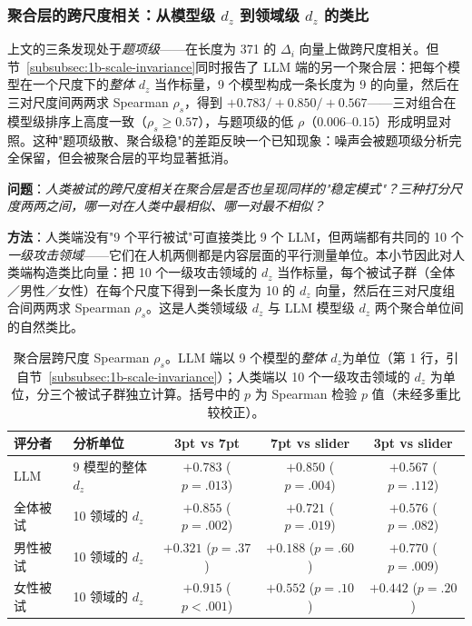 \documentclass[UTF8,12pt]{ctexart}
\begin{document}
\subsubsection{聚合层的跨尺度相关：从模型级 $d_z$ 到领域级 $d_z$ 的类比}
\label{subsubsec:2a-cross-scale-aggregate}

上文的三条发现处于\emph{题项级}——在长度为 371 的 $\Delta_i$ 向量上做跨尺度相关。但节~\ref{subsubsec:1b-scale-invariance}同时报告了 LLM 端的另一个聚合层：把每个模型在一个尺度下的\emph{整体} $d_z$ 当作标量，9 个模型构成一条长度为 9 的向量，然后在三对尺度间两两求 Spearman $\rho_s$，得到 $+0.783 / +0.850 / +0.567$——三对组合在模型级排序上高度一致（$\rho_s \geq 0.57$），与题项级的低 $\rho$（$0.006$--$0.15$）形成明显对照。这种"题项级散、聚合级稳"的差距反映一个已知现象：噪声会被题项级分析完全保留，但会被聚合层的平均显著抵消。

\textbf{问题}：\emph{人类被试的跨尺度相关在聚合层是否也呈现同样的"稳定模式"？三种打分尺度两两之间，哪一对在人类中最相似、哪一对最不相似？}

\textbf{方法}：人类端没有"9 个平行被试"可直接类比 9 个 LLM，但两端都有共同的 10 个\emph{一级攻击领域}——它们在人机两侧都是内容层面的平行测量单位。本小节因此对人类端构造类比向量：把 10 个一级攻击领域的 $d_z$ 当作标量，每个被试子群（全体／男性／女性）在每个尺度下得到一条长度为 10 的 $d_z$ 向量，然后在三对尺度组合间两两求 Spearman $\rho_s$。这是人类领域级 $d_z$ 与 LLM 模型级 $d_z$ 两个聚合单位间的自然类比。

\begin{table}[htbp]
    \centering
    \caption{聚合层跨尺度 Spearman $\rho_s$。LLM 端以 9 个模型的\emph{整体 $d_z$}为单位（第 1 行，引自节~\ref{subsubsec:1b-scale-invariance}）；人类端以 10 个一级攻击领域的 $d_z$ 为单位，分三个被试子群独立计算。括号中的 $p$ 为 Spearman 检验 $p$ 值（未经多重比较校正）。}
    \label{tab:2a-cross-scale-aggregate}
    \footnotesize
    \setlength{\tabcolsep}{5pt}
    \begin{tabular}{llccc}
        \toprule
        评分者 & 分析单位 & 3pt vs 7pt & 7pt vs slider & 3pt vs slider \\
        \midrule
        LLM     & 9 模型的整体 $d_z$          & $+0.783$ ($p=.013$) & $+0.850$ ($p=.004$) & $+0.567$ ($p=.112$) \\
        \midrule
        全体被试 & 10 领域的 $d_z$              & $+0.855$ ($p=.002$) & $+0.721$ ($p=.019$) & $+0.576$ ($p=.082$) \\
        男性被试 & 10 领域的 $d_z$              & $+0.321$ ($p=.37$)  & $+0.188$ ($p=.60$)  & $+0.770$ ($p=.009$) \\
        女性被试 & 10 领域的 $d_z$              & $+0.915$ ($p<.001$) & $+0.552$ ($p=.10$)  & $+0.442$ ($p=.20$) \\
        \bottomrule
    \end{tabular}
\end{table}
\end{document}
